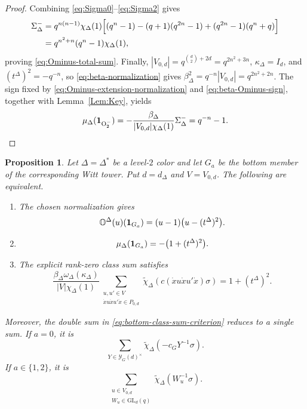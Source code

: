 \documentclass[12pt]{amsart}
\numberwithin{itemcounter}{subsection}
\theoremstyle{plain}
\newtheorem{proposition}[theorem]{Proposition}
\theoremstyle{definition}
\theoremstyle{remark}
\numberwithin{equation}{section}
\def\bbO{\mathbb{O}}
\def\O{\mathrm{O}}
\def\GL{\mathrm{GL}}
\def\W{\operatorname{W}\nolimits}
\begin{document}
\begin{proof}
Combining \eqref{eq:Sigma0}--\eqref{eq:Sigma2} gives
\begin{align*}
\Sigma_\Delta^-
&=q^{n(n-1)}\chi_\Delta(1)
\Bigl[(q^n-1)-(q+1)(q^{2n}-1)
 +(q^{2n}-1)(q^n+q)\Bigr]\\
&=q^{n^2+n}(q^n-1)\chi_\Delta(1),
\end{align*}
proving \eqref{eq:Ominus-total-sum}.
Finally, \(|V_{0,d}|=q^{\binom d2+2d}=q^{2n^2+3n}\),
\(\kappa_\Delta=I_d\), and \((t^\Delta)^2=-q^{-n}\), so
\eqref{eq:beta-normalization} gives
\(\beta_\Delta^2=q^{-n}|V_{0,d}|=q^{2n^2+2n}\).
The sign fixed by \eqref{eq:Ominus-extension-normalization} and
\eqref{eq:beta-Ominus-sign}, together with Lemma~\ref{Lem:Key}, yields
\[
 \mu_\Delta({\bf1}_{\O^-_2})
 =-\frac{\beta_\Delta}{|V_{0,d}|\chi_\Delta(1)}\Sigma_\Delta^-
 =q^{-n}-1.
\]
\end{proof}

\begin{proposition}
\label{prop:normalization}
Let $\Delta=\Delta^*$ be a level-$2$ color and let $G_a$ be the bottom
member of the corresponding Witt tower.  Put $d=d_\Delta$ and
$V=V_{0,d}$.  The following are equivalent.
\begin{enumerate}
\item The chosen normalization gives
\[
\bbO^\Delta(u)({\bf1}_{G_a})
=(u-1)\bigl(u-(t^\Delta)^2\bigr).
\]
\item
\[
\mu_\Delta({\bf1}_{G_a})=-\bigl(1+(t^\Delta)^2\bigr).
\]
\item The explicit rank-zero class sum satisfies
\begin{equation}\label{eq:bottom-class-sum-criterion}
\frac{\beta_\Delta\omega_\Delta(\kappa_\Delta)}{|V|\chi_\Delta(1)}
\sum_{\substack{u,u'\in V\\
\dot{x}u\dot{x}u'\dot{x}\in P_{0,d}}}
\widetilde\chi_\Delta\!\left(
 c(\dot{x}u\dot{x}u'\dot{x})\sigma\right)
=1+(t^\Delta)^2.
\end{equation}
\end{enumerate}
Moreover, the double sum in \eqref{eq:bottom-class-sum-criterion}
reduces to a single sum.  If $a=0$, it is
\begin{equation}\label{eq:bottom-single-sum-a0}
\sum_{Y\in\mathscr Y_G(d)^\times}
\widetilde\chi_\Delta(-c_GY^{-1}\sigma).
\end{equation}
If $a\in\{1,2\}$, it is
\begin{equation}\label{eq:bottom-single-sum-a12}
\sum_{\substack{u\in V_{0,d}\\W_u\in\GL_d(q)}}
\widetilde\chi_\Delta(W_u^{-1}\sigma).
\end{equation}
\end{proposition}
\end{document}
